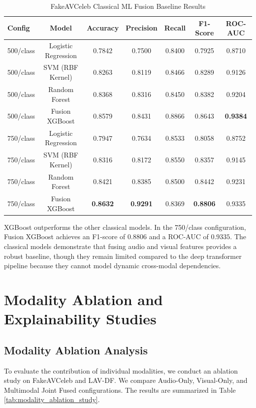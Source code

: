 \documentclass[journal,10pt,onecolumn,draftclsnofoot]{IEEEtran}
\begin{document}
\begin{table}[htbp]
\caption{FakeAVCeleb Classical ML Fusion Baseline Results}
\label{tab:classical_ml_baselines}
\centering
\begin{tabular}{lcccccc}
\toprule
Config & Model & Accuracy & Precision & Recall & F1-Score & ROC-AUC \\
\midrule
500/class & Logistic Regression & 0.7842 & 0.7500 & 0.8400 & 0.7925 & 0.8710 \\
500/class & SVM (RBF Kernel) & 0.8263 & 0.8119 & 0.8466 & 0.8289 & 0.9126 \\
500/class & Random Forest & 0.8368 & 0.8316 & 0.8450 & 0.8382 & 0.9204 \\
500/class & Fusion XGBoost & 0.8579 & 0.8431 & 0.8866 & 0.8643 & \textbf{0.9384} \\
\midrule
750/class & Logistic Regression & 0.7947 & 0.7634 & 0.8533 & 0.8058 & 0.8752 \\
750/class & SVM (RBF Kernel) & 0.8316 & 0.8172 & 0.8550 & 0.8357 & 0.9145 \\
750/class & Random Forest & 0.8421 & 0.8385 & 0.8500 & 0.8442 & 0.9231 \\
750/class & Fusion XGBoost & \textbf{0.8632} & \textbf{0.9291} & 0.8369 & \textbf{0.8806} & 0.9335 \\
\bottomrule
\end{tabular}
\end{table}

XGBoost outperforms the other classical models. In the 750/class configuration, Fusion XGBoost achieves an F1-score of $0.8806$ and a ROC-AUC of $0.9335$. The classical models demonstrate that fusing audio and visual features provides a robust baseline, though they remain limited compared to the deep transformer pipeline because they cannot model dynamic cross-modal dependencies.

\section{Modality Ablation and Explainability Studies}
\subsection{Modality Ablation Analysis}
To evaluate the contribution of individual modalities, we conduct an ablation study on FakeAVCeleb and LAV-DF. We compare Audio-Only, Visual-Only, and Multimodal Joint Fused configurations. The results are summarized in Table \ref{tab:modality_ablation_study}.
\end{document}
